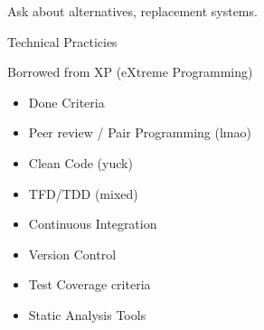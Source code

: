 \documentclass{report}
\begin{document}
\begin{description}
        Ask about alternatives, replacement systems.
    \item Technical Practicies

        Borrowed from XP (eXtreme Programming)
        \begin{itemize}
            \item Done Criteria
            \item Peer review / Pair Programming (lmao)
            \item Clean Code (yuck)
            \item TFD/TDD (mixed)
            \item Continuous Integration
            \item Version Control
            \item Test Coverage criteria
            \item Static Analysis Tools
        \end{itemize}

\end{description}
\end{document}
